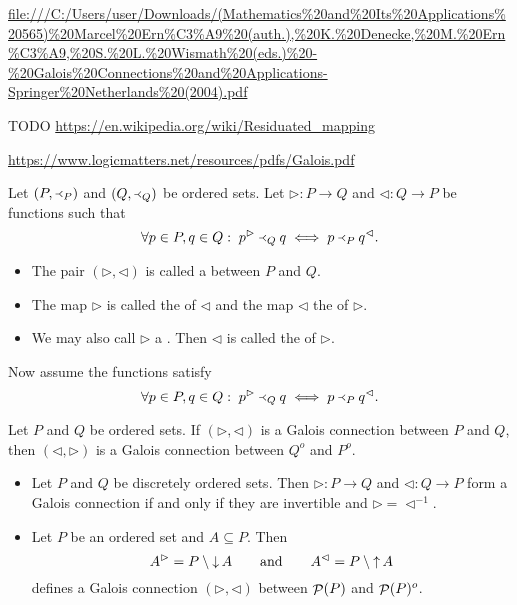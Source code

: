 \url{file:///C:/Users/user/Downloads/(Mathematics%20and%20Its%20Applications%20565)%20Marcel%20Ern%C3%A9%20(auth.),%20K.%20Denecke,%20M.%20Ern%C3%A9,%20S.%20L.%20Wismath%20(eds.)%20-%20Galois%20Connections%20and%20Applications-Springer%20Netherlands%20(2004).pdf}

TODO \url{https://en.wikipedia.org/wiki/Residuated_mapping}

\url{https://www.logicmatters.net/resources/pdfs/Galois.pdf}

\begin{definition}
Let $\left( P,\Yleft_P \right)$ and $\left( Q,\Yleft_Q \right)$ be ordered sets. Let $\rhd: P\to Q$ and $\lhd: Q \to P$ be functions such that
\[ \forall p\in P, q\in Q: \; p^\rhd \Yleft_Q q \iff p \Yleft_P q^\lhd. \]
\begin{itemize}
\item The pair $(\rhd, \lhd)$ is called a  between $P$ and $Q$.
\item The map $\rhd$ is called the  of $\lhd$ and the map $\lhd$ the  of $\rhd$.
\item We may also call $\rhd$ a . Then $\lhd$ is called the  of $\rhd$.
\end{itemize}

Now assume the functions satisfy
\[ \forall p\in P, q\in Q: \; p^\rhd \Yleft_Q q \iff p \Yleft_P q^\lhd. \]
\end{definition}

\begin{lemma}
Let $P$ and $Q$ be ordered sets. If $(\rhd, \lhd)$ is a Galois connection between $P$ and $Q$, then $(\lhd, \rhd)$ is a Galois connection between $Q^o$ and $P^o$.
\end{lemma}

\begin{example}
\begin{itemize}
\item Let $P$ and $Q$ be discretely ordered sets. Then $\rhd: P\to Q$ and $\lhd: Q \to P$ form a Galois connection if and only if they are invertible and $\rhd = \lhd^{-1}$.
\item Let $P$ be an ordered set and $A\subseteq P$. Then
\[ A^\rhd = P\setminus \mathop{\downarrow} A \qquad \text{and} \qquad A^\lhd = P\setminus \mathop{\uparrow} A \]
defines a Galois connection $(\rhd, \lhd)$ between $\mathop{\mathcal{P}}(P)$ and $\mathop{\mathcal{P}}(P)^o$.
\end{itemize}
\end{example}

